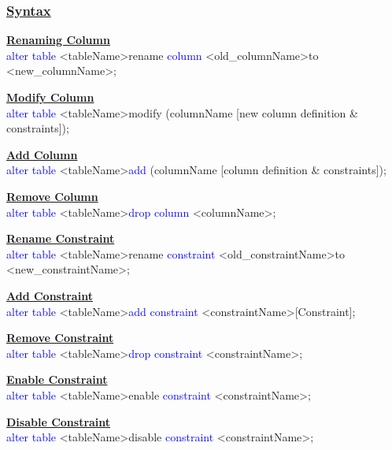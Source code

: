 \subsubsection*{\underline{Syntax}}
\begin{tcolorbox}[title = Columns Modification]
\textbf{\underline{Renaming Column}}\\
\textcolor{blue}{alter table} \textless tableName\textgreater rename \textcolor{blue}{column} \textless old\_columnName\textgreater to \textless new\_columnName\textgreater;

\textbf{\underline{Modify Column}}\\
\textcolor{blue}{alter table} \textless tableName\textgreater modify (columnName [new column definition \& constraints]);

\textbf{\underline{Add Column}}\\
\textcolor{blue}{alter table} \textless tableName\textgreater \textcolor{blue}{add} (columnName [column definition \& constraints]);

\textbf{\underline{Remove Column}}\\
\textcolor{blue}{alter table} \textless tableName\textgreater \textcolor{blue}{drop column} \textless columnName\textgreater;
\end{tcolorbox}

\begin{tcolorbox}[title = Constraints]
    \textbf{\underline{Rename Constraint}}\\
    \textcolor{blue}{alter table} \textless tableName\textgreater rename \textcolor{blue}{constraint} \textless old\_constraintName\textgreater to \textless new\_constraintName\textgreater;

    \textbf{\underline{Add Constraint}}\\
    \textcolor{blue}{alter table} \textless tableName\textgreater \textcolor{blue}{add constraint} \textless constraintName\textgreater [Constraint];
    
    \textbf{\underline{Remove Constraint}}\\
    \textcolor{blue}{alter table} \textless tableName\textgreater \textcolor{blue}{drop constraint} \textless constraintName\textgreater;

    \textbf{\underline{Enable Constraint}}\\
    \textcolor{blue}{alter table} \textless tableName\textgreater enable \textcolor{blue}{constraint} \textless constraintName\textgreater;
    
    \textbf{\underline{Disable Constraint}}\\
    \textcolor{blue}{alter table} \textless tableName\textgreater disable \textcolor{blue}{constraint} \textless constraintName\textgreater;
\end{tcolorbox}
